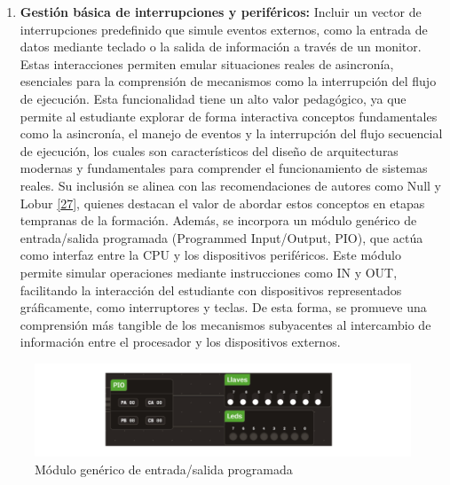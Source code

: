 \documentclass[12pt,oneside]{templates/unerthesis}
\providecommand{\tightlist}{%
  \setlength{\itemsep}{0pt}\setlength{\parskip}{0pt}}
\begin{document}
\begin{enumerate}
\def\labelenumi{\arabic{enumi}.}
\setcounter{enumi}{4}
\tightlist
\item
  \textbf{Gestión básica de interrupciones y periféricos:}
  Incluir un vector de interrupciones predefinido que simule eventos externos, como la entrada de datos mediante teclado o la salida de información a través de un monitor. Estas interacciones permiten emular situaciones reales de asincronía, esenciales para la comprensión de mecanismos como la interrupción del flujo de ejecución. Esta funcionalidad tiene un alto valor pedagógico, ya que permite al estudiante explorar de forma interactiva conceptos fundamentales como la asincronía, el manejo de eventos y la interrupción del flujo secuencial de ejecución, los cuales son característicos del diseño de arquitecturas modernas y fundamentales para comprender el funcionamiento de sistemas reales. Su inclusión se alinea con las recomendaciones de autores como Null y Lobur \protect\hyperlink{ref-null_essentials_2023}{{[}27{]}}, quienes destacan el valor de abordar estos conceptos en etapas tempranas de la formación. Además, se incorpora un módulo genérico de entrada/salida programada (Programmed Input/Output, PIO), que actúa como interfaz entre la CPU y los dispositivos periféricos. Este módulo permite simular operaciones mediante instrucciones como IN y OUT, facilitando la interacción del estudiante con dispositivos representados gráficamente, como interruptores y teclas. De esta forma, se promueve una comprensión más tangible de los mecanismos subyacentes al intercambio de información entre el procesador y los dispositivos externos.
\end{enumerate}

\begin{figure}

{\centering \includegraphics[width=0.85\linewidth]{images/perifericos} 

}

\caption{Módulo genérico de entrada/salida programada}\label{fig:perifericos}
\end{figure}
\end{document}
